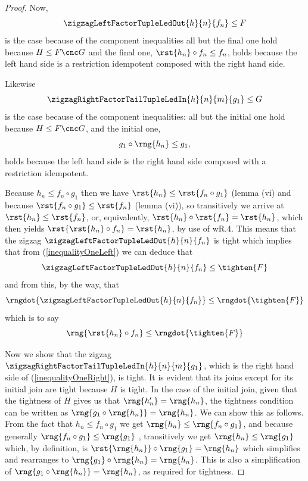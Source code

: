 {\begin{proof}
Now,  
\begin{equation}
\label{inequalityOneLeft}
\zigzagLeftFactorTupleLedOut{h}{n}{f_n} \leq F
\end{equation}
is the case because of the component inequalities all but the final one hold because $H \leq F \cnc G$
 and the final one, $\rst{h_n} \circ f_n \leq f_n$,
holds because
the left hand side is a restriction idempotent composed with the right hand side.

Likewise
\begin{equation}
\label{inequalityOneRight}
\zigzagRightFactorTailTupleLedIn{h}{n}{m}{g_1} \leq G
\end{equation}
is the case because of the component inequalities: all but the initial one hold because
$H \leq F \cnc G$,
and the initial one,
\[
g_1 \circ \rng{h_n} \leq g_1,
\]
holds because the left hand side is the right hand side composed with a restriction idempotent.

Because $h_n \leq f_n \circ g_1$ then we have
$\rst{h_n} \leq \rst{f_n \circ g_1}$
(lemma  (vi) and because $\rst{f_n \circ g_1} \leq \rst{f_n}$ (lemma  (vi)), 
so transitively we arrive at $\rst{h_n} \leq \rst{f_n}$, or, 
equivalently, $\rst{h_n} \circ \rst{f_n} = \rst{h_n}$, which then yields $\rst{\rst{h_n} \circ f_n} = \rst{h_n}$, by use of wR.4.
This means  that the zigzag  
$\zigzagLeftFactorTupleLedOut{h}{n}{f_n}$ 
is tight which implies that
 from (\ref{inequalityOneLeft})  we can deduce that
\[
\zigzagLeftFactorTupleLedOut{h}{n}{f_n} \leq \tighten{F}
\]
and from this, by the way, that
\[
\rngdot{\zigzagLeftFactorTupleLedOut{h}{n}{f_n}} 
\leq \rngdot{\tighten{F}}
\]
which is to say 
\begin{equation}
\label{inequalityThreeLeft}
\rng{\rst{h_n} \circ f_n} \leq \rngdot{\tighten{F}}
\end{equation}

Now we show that the zigzag 
$\zigzagRightFactorTailTupleLedIn{h}{n}{m}{g_1}$,
which is the right hand side of (\ref{inequalityOneRight}),
is tight. It is evident that its joins except for its initial join are tight because $H$ is tight.
In the case of the initial join,
given that the tightness of $H$ gives us 
that $\rng{h'_n}=\rng{h_n}$,
the tightness condition can be written as
$\rng{g_1 \circ \rng{h_n}} = \rng{h_n}$.
We can show this as follows.  
From the fact that
$h_n \leq f_n \circ g_1$ we get
$\rng{h_n} \leq \rng{f_n \circ g_1}$,
and because generally $\rng{f_n \circ g_1} \leq \rng{g_1}$ ,
transitively we get 
$\rng{h_n} \leq \rng{g_1}$
which, by definition, is $\rst{\rng{h_n}} \circ \rng{g_1} = \rng{h_n}$
which simplifies and rearranges to
$\rng{g_1} \circ \rng{h_n} = \rng{h_n}$.
This is also a simplification of
$\rng{g_1 \circ \rng{h_n}} = \rng{h_n}$, as required for tightness.


\end{proof}}
